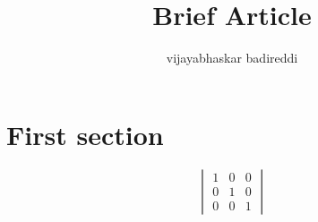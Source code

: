 \documentclass[12pt]{article}
\title{Brief Article}
\author{vijayabhaskar badireddi}
\begin{document}

\section*{First section}

\begin{equation}
\begin{vmatrix}
1 & 0 & 0 \\ 0 & 1 & 0 \\ 0 & 0 & 1
\end{vmatrix}
\end{equation}

\begin{equation}
\end{equation}
\end{document}
